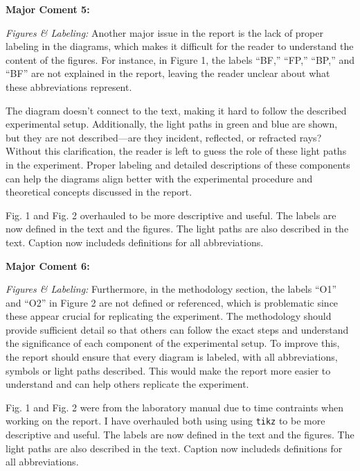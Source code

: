\documentclass[%
 aip,
cp,  %
 amsmath,amssymb,
 reprint,%
]{revtex4-2}
\begin{document}
        \begin{mdframed} \textbf{Major Coment 5:}

            \textit{Figures \& Labeling:} Another major issue in the report is the lack of proper labeling in the diagrams, which makes it difficult for the reader to understand the content of the figures. For instance, in Figure 1, the labels
            ``BF,'' ``FP,'' ``BP,'' and ``BF'' are not explained in the report, leaving the reader unclear about what these abbreviations represent.

            The diagram doesn't connect to the text, making it hard to follow the described experimental setup. Additionally, the light paths in green and blue are shown, but they are not described—are they incident, reflected, or refracted rays? Without this clarification, the reader is left to guess the role of these light paths in the experiment. Proper labeling and detailed descriptions of these components can help the diagrams align better with the experimental procedure and theoretical concepts discussed in the report.
        \end{mdframed}
        {\color{red}
        
            Fig. 1 and Fig. 2 overhauled to be more descriptive and useful. The labels are now defined in the text and the figures. The light paths are also described in the text. Caption now includeds definitions for all abbreviations.

        }

        \begin{mdframed} \textbf{Major Coment 6:}

            \textit{Figures \& Labeling:} Furthermore, in the methodology section, the labels ``O1'' and ``O2'' in Figure 2 are not defined or referenced, which is problematic since these appear crucial for replicating the experiment. The methodology should provide sufficient detail so that others can follow the exact steps and understand the significance of each component of the experimental setup. To improve this, the report should ensure that every diagram is labeled, with all abbreviations, symbols or light paths described. This would make the report more easier to understand and can help others replicate the experiment.
            
        \end{mdframed}
        {\color{red}
        Fig. 1 and Fig. 2 were from the laboratory manual due to time contraints when working on the report. I have overhauled both using  using \texttt{tikz} to be more descriptive and useful.  The labels are now defined in the text and the figures. The light paths are also described in the text. Caption now includeds definitions for all abbreviations.

        }
\end{document}
